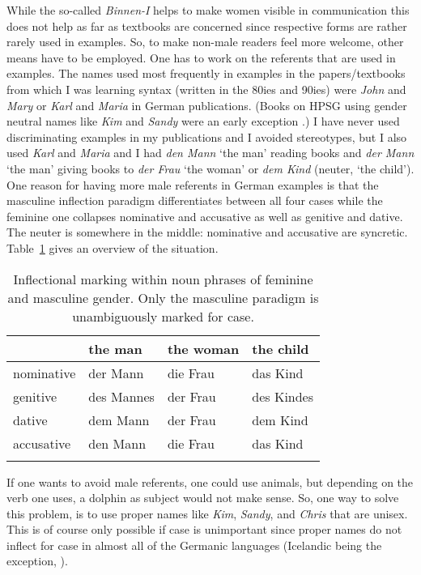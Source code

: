 While the so-called \emph{Binnen-I} helps to make women visible in communication this does not help
as far as textbooks are concerned since respective forms are rather rarely used in examples. So, to
make non-male readers feel more welcome, other means have to be employed. One has to work on the
referents that are used in examples. The names used most frequently in examples in the papers/textbooks from which I was learning syntax
(written in the 80ies and 90ies) were \emph{John} and \emph{Mary} or \emph{Karl} and \emph{Maria} in
German publications. (Books on HPSG using gender neutral names like \emph{Kim} and \emph{Sandy} were an early exception \citep{ps,ps2}.)
I have never used discriminating examples in my publications and I avoided stereotypes, but I also used
\emph{Karl} and \emph{Maria} and I had \emph{den Mann} `the man' reading books and \emph{der Mann}
`the man' giving books to \emph{der Frau} `the woman' or \emph{dem Kind} (neuter, `the child'). One
reason for having more male referents in German examples is that the masculine inflection paradigm
differentiates between all four cases while the feminine one collapses nominative and accusative as
well as genitive and dative. The neuter is somewhere in the middle: nominative and accusative are syncretic. Table~\ref{table-German-case-syncretism} gives an overview of the situation.
\begin{table}
\begin{tabular}{llll}\lsptoprule
           & the man    & the woman & the child\\\midrule
nominative & der Mann   & die Frau  & das Kind\\
genitive   & des Mannes & der Frau  & des Kindes\\
dative     & dem Mann   & der Frau  & dem Kind\\
accusative & den Mann   & die Frau  & das Kind\\
\lspbottomrule
\end{tabular}
\caption{\label{table-German-case-syncretism}Inflectional marking within noun phrases of feminine and masculine gender. Only the masculine
  paradigm is unambiguously marked for case.}
\end{table}  
If one wants to avoid male referents, one could use animals, but depending on the verb one
uses, a dolphin as subject would not make sense. So, one way to solve this problem, is to use proper
names like \emph{Kim}, \emph{Sandy}, and \emph{Chris} that are unisex. This is of course only
possible if case is unimportant since proper names do not inflect for case in almost all of the Germanic
languages (Icelandic being the exception, \citealp[]{ZMT85a}). 

